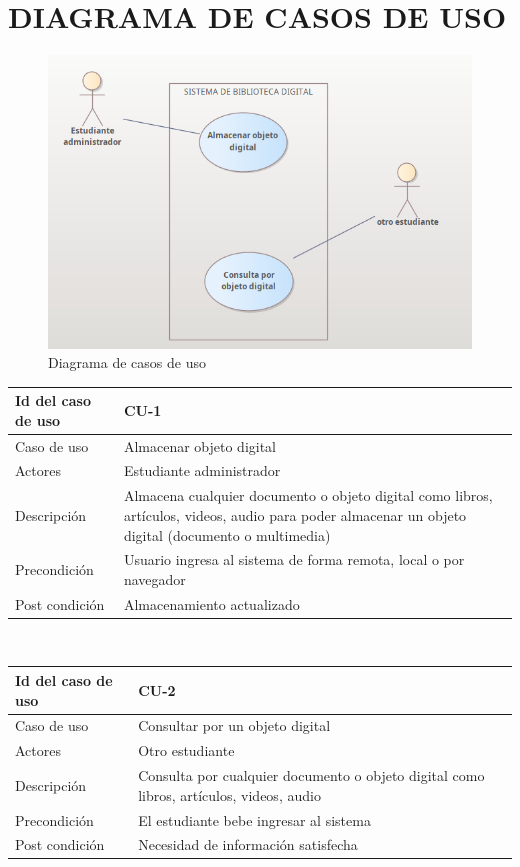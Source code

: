 \chapter*{DIAGRAMA DE CASOS DE USO}




\begin{figure}[ht]
	\centering
	\includegraphics[scale=0.8]{images/casoUso2}
	\caption{Diagrama de casos de uso}
\end{figure}
\begin{center}
\begin{tabular}{lp{10cm}}
    Id del caso de uso & CU-1 \\
    \hline
    Caso de uso & Almacenar objeto digital \\
    Actores & Estudiante administrador \\
    Descripción & Almacena cualquier documento o objeto digital como libros, artículos, videos, audio para poder almacenar un objeto digital (documento o multimedia)  \\
    Precondición & Usuario ingresa al sistema de forma remota, local o por navegador \\
    Post condición & Almacenamiento actualizado \\
\end{tabular}\\
\vspace{0.5cm}
\begin{tabular}{lp{10cm}}
    Id del caso de uso & CU-2 \\
    \hline
    Caso de uso & Consultar por un objeto digital \\
    Actores & Otro estudiante \\
    Descripción & Consulta por cualquier documento o objeto digital como libros, artículos, videos, audio  \\
    Precondición & El estudiante bebe ingresar al sistema\\
    Post condición & Necesidad de información satisfecha \\
\end{tabular}
\end{center}
